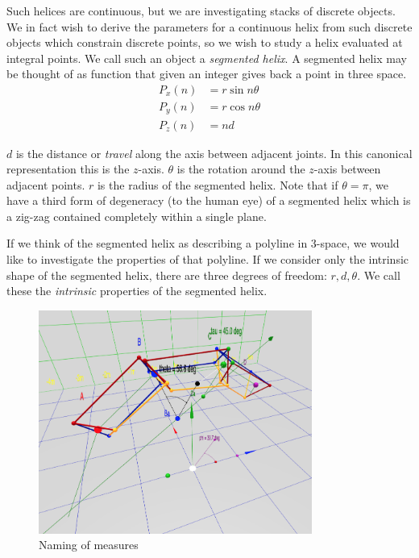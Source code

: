 \documentclass[11pt]{article}
\begin{document}
{Such helices are continuous, but we are investigating stacks of discrete objects. We in fact wish to derive
the parameters for a continuous helix from such discrete objects which constrain discrete points, so we wish
to study a helix evaluated at integral points. We call such an object a {\em segmented helix}.
A segmented helix may be thought of as function that given an integer gives back a point in three space.
\begin{align*}
    P_x(n) &= r \sin{n \theta}  \\
    P_y(n) &= r \cos{n \theta} \\
   P_z(n) &= n d
\end{align*}

$d$ is the distance or {\em travel} along the axis between adjacent joints. In this canonical representation this is
the $z$-axis.
$\theta$ is the rotation around the $z$-axis
between adjacent points.
$r$ is the radius of the segmented helix.
Note that if $\theta = \pi$, we have a third form of degeneracy (to the human eye) of a segmented helix
which is a zig-zag contained completely within a single plane.

If we think of the segmented helix as describing a polyline in 3-space, we would like to investigate
the properties of that polyline. If we consider only the intrinsic shape of the segmented helix, there are three degrees
of freedom: $r,d,\theta$. We call these the {\em intrinsic} properties of the segmented helix.

\begin{figure}
     \centering
     \includegraphics[width=0.80\textwidth]{figures/ABCDFigure.png}
     \caption{Naming of measures}
  \label{fig:naming}
\end{figure}

}
\end{document}
